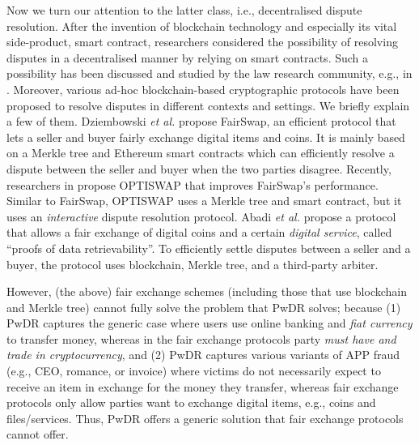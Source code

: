 Now we turn our attention to the latter class, i.e., decentralised dispute resolution. After the invention of blockchain technology and especially its vital side-product, smart contract, researchers considered the possibility of resolving disputes in a decentralised manner by relying on smart contracts. Such a possibility has been discussed and studied by the law research community, e.g., in \cite{buchwald2019smart,ortolani2016self,ortolani2019impact}. Moreover,  various ad-hoc blockchain-based cryptographic protocols have been proposed to resolve disputes in different contexts and settings. We briefly explain a few of them. Dziembowski \textit{et al.}  \cite{DziembowskiEF18} propose FairSwap, an efficient protocol that lets a seller and buyer fairly exchange digital items and coins. It is mainly based on a Merkle tree and Ethereum smart contracts which can efficiently resolve a dispute between the seller and buyer when the two parties disagree. Recently, researchers in  \cite{EckeyFS20} propose OPTISWAP that improves FairSwap’s performance. Similar to FairSwap, OPTISWAP uses a Merkle tree and smart contract, but it uses an \emph{interactive} dispute resolution protocol. Abadi \textit{et al.} \cite{AbadiMZ21a} propose a protocol that allows a  fair exchange of digital coins and a certain \emph{digital service}, called ``proofs of data retrievability''. To efficiently settle disputes between a seller and a buyer, the protocol uses blockchain, Merkle tree, and a third-party arbiter.



However, (the above) fair exchange schemes (including those that use blockchain and Merkle tree) cannot fully solve the problem that PwDR solves; because (1) PwDR captures the generic case where users use online banking and \emph{fiat currency} to transfer money, whereas in the fair exchange protocols party \emph{must have and trade in cryptocurrency}, and (2) PwDR captures various variants of APP fraud (e.g., CEO, romance, or invoice) where victims do not necessarily expect to receive an item in exchange for the money they transfer, whereas fair exchange protocols only allow parties want to exchange digital items, e.g., coins and files/services. Thus, PwDR offers a generic solution that fair exchange protocols cannot offer. 


